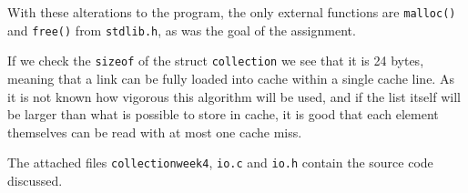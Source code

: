 With these alterations to the program, the only external functions are \texttt{malloc()} and \texttt{free()} from \texttt{stdlib.h}, as was the goal of the assignment.

If we check the \texttt{sizeof} of the struct \texttt{collection} we see that it is 24 bytes, meaning that a link can be fully loaded into cache within a single cache line. As it is not known how vigorous this algorithm will be used, and if the list itself will be larger than what is possible to store in cache, it is good that each element themselves can be read with at most one cache miss.


The attached files \texttt{collectionweek4}, \texttt{io.c} and \texttt{io.h} contain the source code discussed.